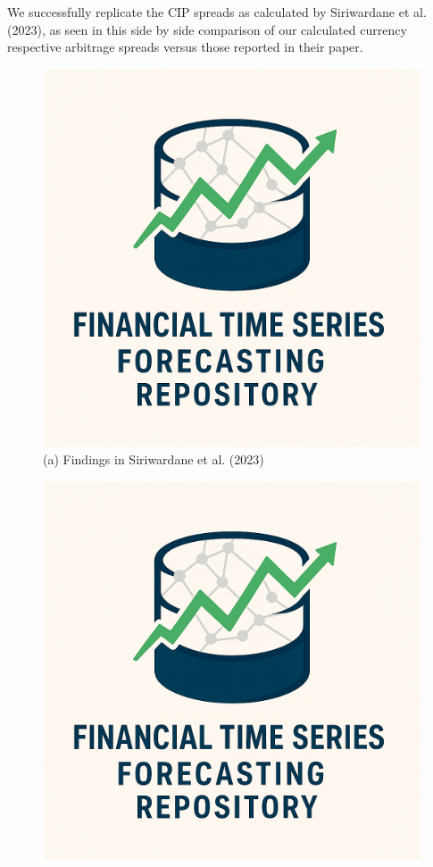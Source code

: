 \documentclass{article}
\begin{document}
We successfully replicate the CIP spreads as calculated by Siriwardane et al. (2023),
as seen in this side by side comparison of our calculated currency respective
arbitrage spreads versus those reported in their paper.

\begin{figure}[htbp]
  \centering
  \begin{minipage}[b]{0.48\textwidth}
    \centering
    \includegraphics[width=\linewidth]{logo.png}
    \\[1ex] %
    {\small (a) Findings in Siriwardane et al. (2023)}
  \end{minipage}
  \hfill
  \begin{minipage}[b]{0.48\textwidth}
    \centering
    \includegraphics[width=\linewidth]{logo.png}

\end{minipage}
\end{figure}
\end{document}
